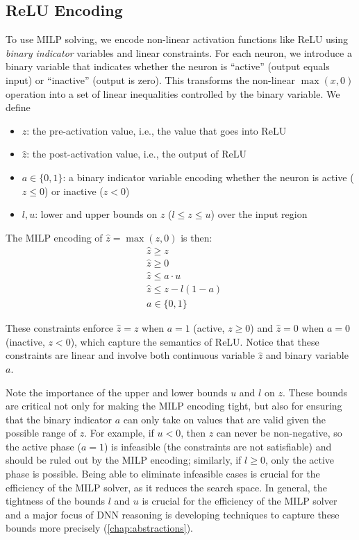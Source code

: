 \documentclass[oneside,11pt,dvipsnames]{book}
\numberwithin{equation}{section}
\theoremstyle{definition}
\theoremstyle{remark}
\begin{document}
\subsection{ReLU Encoding}\label{sec:relu-encoding}

To use MILP solving, we encode non-linear activation functions like ReLU using \emph{binary indicator} variables and linear constraints. For each neuron, we introduce a binary variable that indicates whether the neuron is ``active'' (output equals input) or ``inactive'' (output is zero). This transforms the non-linear $\max(x,0)$ operation into a set of linear inequalities controlled by the binary variable. 
We define 

\begin{itemize}
    \item $z$: the pre-activation value, i.e., the value that goes into ReLU
    \item $\hat{z}$: the post-activation value, i.e., the output of ReLU
    \item $a \in \{0,1\}$: a binary indicator variable encoding whether the neuron is active ($z \le 0$) or inactive ($z < 0$)
    \item $l, u$: lower and upper bounds on $z$ ($l \leq z \leq u$) over the input region 
\end{itemize}

The MILP encoding of $\hat{z} = \max(z, 0)$ is then:
\begin{align*}
    &\hat{z} \geq z \\
    &\hat{z} \geq 0 \\
    &\hat{z} \leq a \cdot u \\
    &\hat{z} \leq z - l(1-a) \\
    &a \in \{0,1\}
\end{align*}

These constraints enforce $\hat{z} = z$ when $a = 1$ (active, $z \geq 0$) and $\hat{z} = 0$ when $a = 0$ (inactive, $z < 0$), which capture the semantics of ReLU. Notice that these constraints are linear and involve both continuous variable $\hat{z}$ and binary variable $a$.



Note the importance of the upper and lower bounds $u$ and $l$ on $z$. These bounds are critical not only for making the MILP encoding tight, but also for ensuring that the binary indicator $a$ can only take on values that are valid given the possible range of $z$. For example, if $u < 0$, then $z$ can never be non-negative, so the active phase ($a=1$) is infeasible (the constraints are not satisfiable) and should be ruled out by the MILP encoding; similarly, if $l \geq 0$, only the active phase is possible. Being able to eliminate infeasible cases is crucial for the efficiency of the MILP solver, as it reduces the search space. In general, the tightness of the bounds $l$ and $u$ is crucial for the efficiency of the MILP solver and a major focus of DNN reasoning is developing techniques to capture these bounds more precisely (\autoref{chap:abstractions}).
\end{document}
